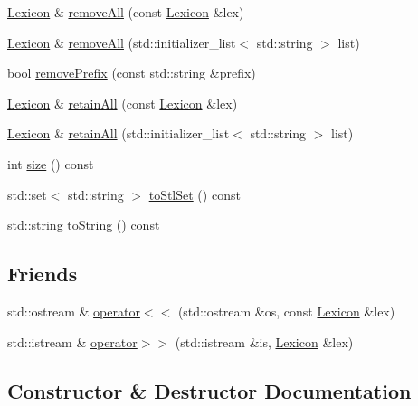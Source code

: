 \begin{DoxyCompactItemize}
\item 
\mbox{\hyperlink{classLexicon}{Lexicon}} \& \mbox{\hyperlink{classLexicon_a606a7338945745d8ac9ce21f456f08d9}{remove\+All}} (const \mbox{\hyperlink{classLexicon}{Lexicon}} \&lex)
\item 
\mbox{\hyperlink{classLexicon}{Lexicon}} \& \mbox{\hyperlink{classLexicon_a8ef0b8a849b2d33d83bc9689c4c4d090}{remove\+All}} (std\+::initializer\+\_\+list$<$ std\+::string $>$ list)
\item 
bool \mbox{\hyperlink{classLexicon_a998af18a2f0af7d18ce689acee75ca59}{remove\+Prefix}} (const std\+::string \&prefix)
\item 
\mbox{\hyperlink{classLexicon}{Lexicon}} \& \mbox{\hyperlink{classLexicon_a38501eec95ff302cb83dae17ab478b81}{retain\+All}} (const \mbox{\hyperlink{classLexicon}{Lexicon}} \&lex)
\item 
\mbox{\hyperlink{classLexicon}{Lexicon}} \& \mbox{\hyperlink{classLexicon_a17b175aadba16c14093da01963914b33}{retain\+All}} (std\+::initializer\+\_\+list$<$ std\+::string $>$ list)
\item 
int \mbox{\hyperlink{classLexicon_af9593d4a5ff4274efaf429cb4f9e57cc}{size}} () const
\item 
std\+::set$<$ std\+::string $>$ \mbox{\hyperlink{classLexicon_a56b9ca7800c467295cab333fd9815291}{to\+Stl\+Set}} () const
\item 
std\+::string \mbox{\hyperlink{classLexicon_a1fe5121d6528fdea3f243321b3fa3a49}{to\+String}} () const
\end{DoxyCompactItemize}
\subsection*{Friends}
\begin{DoxyCompactItemize}
\item 
std\+::ostream \& \mbox{\hyperlink{classLexicon_af4dde954854b1ec1072266b3042d44a6}{operator$<$$<$}} (std\+::ostream \&os, const \mbox{\hyperlink{classLexicon}{Lexicon}} \&lex)
\item 
std\+::istream \& \mbox{\hyperlink{classLexicon_a1f966ac4d3b3849aa4bc556d995c24ba}{operator$>$$>$}} (std\+::istream \&is, \mbox{\hyperlink{classLexicon}{Lexicon}} \&lex)
\end{DoxyCompactItemize}


\subsection{Constructor \& Destructor Documentation}
\mbox{\label{classLexicon_ac38cafae91a89528e71f257cbad724fd}} 
